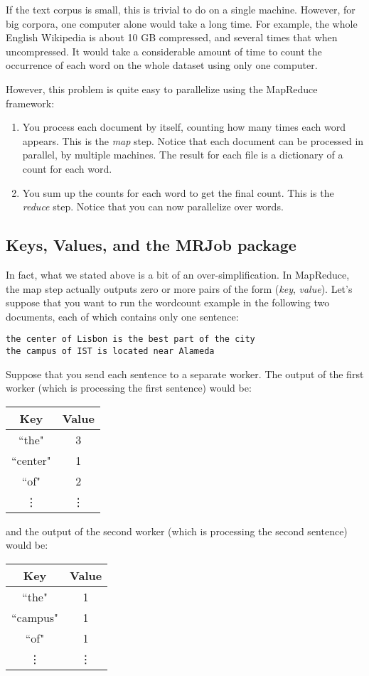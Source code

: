 If the text corpus is small, this is trivial to do on a single machine. However, for big corpora, one computer alone would take a long time. For example, the whole English Wikipedia is about 10 GB compressed, and several times that when uncompressed. It would take a considerable amount of time to count the occurrence of each word on the whole dataset using only one computer.

However, this problem is quite easy to parallelize using the MapReduce framework:

\begin{enumerate}
\item You process each document by itself, counting how many times each word
appears. This is the \emph{map} step. Notice that each document can be
processed in parallel, by multiple machines. The result for each file is a
dictionary of a count for each word.
\item You sum up the counts for each word to get the final count. This is the
\emph{reduce} step. Notice that you can now parallelize over words.
\end{enumerate}

\subsection{Keys, Values, and the MRJob package}
In fact, what we stated above is a bit of an over-simplification. In MapReduce, the map step actually outputs zero or more pairs of the form (\emph{key}, \emph{value}). Let's suppose that you want to run the wordcount example in the following two documents, each of which contains only one sentence:
%
\begin{verbatim}
the center of Lisbon is the best part of the city
the campus of IST is located near Alameda
\end{verbatim}
%
Suppose that you send each sentence to a separate worker. The output of the first worker (which is processing the first sentence) would be:
%
\begin{center}
\begin{tabular}{|c|c|}
\hline
Key & Value \\
\hline\hline
``the" & 3 \\
``center" & 1 \\
``of" & 2\\
\vdots & \vdots \\
\end{tabular}
\end{center}
%
and the output of the second worker (which is processing the second sentence) would be:
%
\begin{center}
\begin{tabular}{|c|c|}
\hline
Key & Value \\
\hline\hline
``the" & 1 \\
``campus" & 1 \\
``of" & 1\\
\vdots & \vdots \\
\end{tabular}
\end{center}

